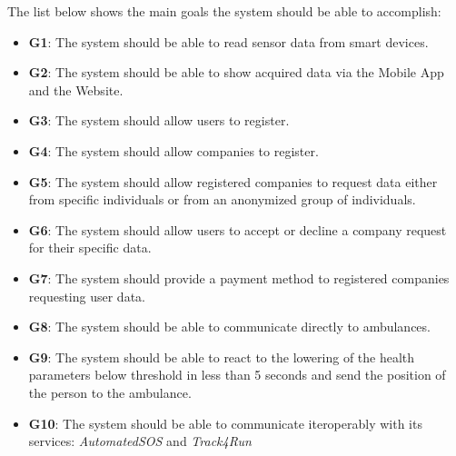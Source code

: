 The list below shows the main goals the system should be able to accomplish:

\begin{itemize}
    \item \textbf{G1}: The system should be able to read sensor data from smart devices.
    \item \textbf{G2}: The system should be able to show acquired data via the Mobile App and the Website.
    \item \textbf{G3}: The system should allow users to register.
    \item \textbf{G4}: The system should allow companies to register.
    \item \textbf{G5}: The system should allow registered companies to request data either from specific individuals or from an anonymized group of individuals.
    \item \textbf{G6}: The system should allow users to accept or decline a company request for their specific data.
    \item \textbf{G7}: The system should provide a payment method to registered companies requesting user data.
    \item \textbf{G8}: The system should be able to communicate directly to ambulances.
    \item \textbf{G9}: The system should be able to react to the lowering of the health parameters below threshold in less than 5 seconds and send the position of the person to the ambulance. 
    \item \textbf{G10}: The system should be able to communicate iteroperably with its services: \textit{AutomatedSOS} and \textit{Track4Run}
\end{itemize}





